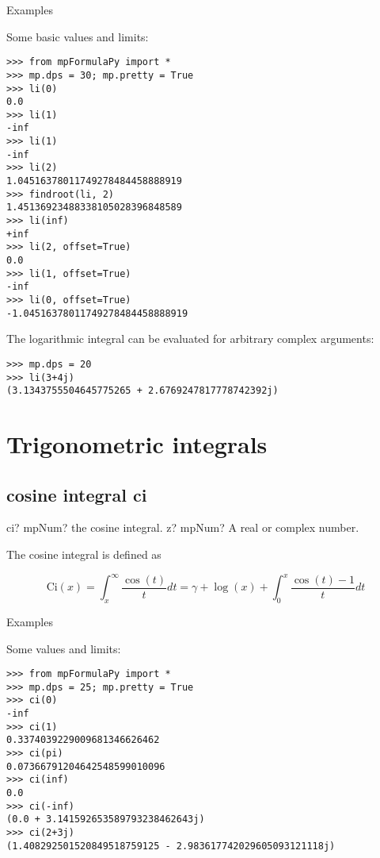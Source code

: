 Examples

Some basic values and limits:


\begin{lstlisting}
>>> from mpFormulaPy import *
>>> mp.dps = 30; mp.pretty = True
>>> li(0)
0.0
>>> li(1)
-inf
>>> li(1)
-inf
>>> li(2)
1.04516378011749278484458888919
>>> findroot(li, 2)
1.45136923488338105028396848589
>>> li(inf)
+inf
>>> li(2, offset=True)
0.0
>>> li(1, offset=True)
-inf
>>> li(0, offset=True)
-1.04516378011749278484458888919
\end{lstlisting}

The logarithmic integral can be evaluated for arbitrary complex arguments:

\begin{lstlisting}
>>> mp.dps = 20
>>> li(3+4j)
(3.1343755504645775265 + 2.6769247817778742392j)
\end{lstlisting}



\newpage
\section{Trigonometric integrals}

\subsection{cosine integral ci}

\begin{mpFunctionsExtract}
	\mpFunctionOne
	{ci? mpNum? the cosine integral.}
	{z? mpNum? A real or complex number.}
\end{mpFunctionsExtract}

\vpara
The cosine integral is defined as

\begin{equation}
\text{Ci}(x)= \int_x^{\infty} \frac{\cos(t)}{t} dt = \gamma + \log(x) + \int_0^x \frac{\cos(t)-1}{t} dt
\end{equation}



Examples

Some values and limits:

\begin{lstlisting}
>>> from mpFormulaPy import *
>>> mp.dps = 25; mp.pretty = True
>>> ci(0)
-inf
>>> ci(1)
0.3374039229009681346626462
>>> ci(pi)
0.07366791204642548599010096
>>> ci(inf)
0.0
>>> ci(-inf)
(0.0 + 3.141592653589793238462643j)
>>> ci(2+3j)
(1.408292501520849518759125 - 2.983617742029605093121118j)
\end{lstlisting}


